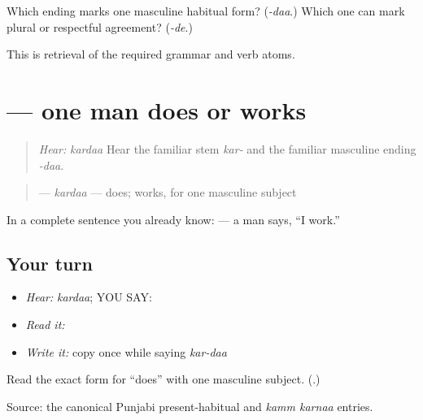 \begin{tcolorbox}[breakable,colback=teal!4,colframe=teal!35!black,title={Before you move on}]
Which ending marks one masculine habitual form? (\emph{-daa}.) Which one can mark plural or respectful agreement? (\emph{-de}.)

This is retrieval of the required grammar and verb atoms.
\end{tcolorbox}
\section[\texorpdfstring{\pa{ਕਰਦਾ} (kardaa)}{ਕਰਦਾ (kardaa)}]{ — one man does or works}

\label{lesson:PA-C183-karda}



\begin{quote}
\emph{Hear:} \emph{kardaa} Hear the familiar stem \emph{kar-} and the familiar masculine ending \emph{-daa}.
\end{quote}

\begin{grammarlens}[title={Grammar Lens: the first exact form}]
\begin{quote}
\textbf{} — \emph{kardaa} — does; works, for one masculine subject
\end{quote}

In a complete sentence you already know: \textbf{   } — a man says, “I work.”
\end{grammarlens}

\subsection*{Your turn}
\begin{itemize}
\raggedright
  \item \emph{Hear:} \emph{kardaa}; YOU SAY: \textbf{}
  \item \emph{Read it:} \textbf{}
  \item \emph{Write it:} copy \textbf{} once while saying \emph{kar-daa}
\end{itemize}

\begin{tcolorbox}[breakable,colback=teal!4,colframe=teal!35!black,title={Before you move on}]
Read the exact form for “does” with one masculine subject. (\textbf{}.)

Source: the canonical Punjabi present-habitual and \emph{kamm karnaa} entries.
\end{tcolorbox}
